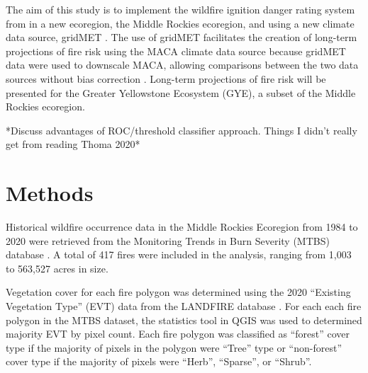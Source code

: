 \documentclass[11pt]{article}
\begin{document}
The aim of this study is to implement the wildfire ignition danger rating system from \citet{thomaWaterBalanceIndicator2020} in a new ecoregion, the Middle Rockies ecoregion, and using a new climate data source, gridMET \citep{abatzoglouDevelopmentGriddedSurface2013}.  The use of gridMET facilitates the creation of long-term projections of fire risk using the MACA climate data source \citep{abatzoglouComparisonStatisticalDownscaling2012} because gridMET data were used to downscale MACA, allowing comparisons between the two data sources without bias correction \citep{tercekRobustProjectionsConsequences2023}.  Long-term projections of fire risk will be presented for the Greater Yellowstone Ecosystem (GYE), a subset of the Middle Rockies ecoregion.  

*Discuss advantages of ROC/threshold classifier approach.  Things I didn't really get from reading Thoma 2020*

\section{Methods}

Historical wildfire occurrence data in the Middle Rockies Ecoregion from 1984 to 2020 were retrieved from the Monitoring Trends in Burn Severity (MTBS) database \citep{eidenshinkProjectMonitoringTrends2007}.  A total of 417 fires were included in the analysis, ranging from 1,003 to 563,527 acres in size.  

Vegetation cover for each fire polygon was determined using the 2020 ``Existing Vegetation Type'' (EVT) data from the LANDFIRE database \citep{rollinsLANDFIRENationallyConsistent2009}.  For each each fire polygon in the MTBS dataset, the statistics tool in QGIS was used to determined majority EVT by pixel count.  Each fire polygon was classified as ``forest'' cover type if the majority of pixels in the polygon were ``Tree'' type or ``non-forest'' cover type if the majority of pixels were ``Herb'', ``Sparse'', or ``Shrub''.  

\end{document}
